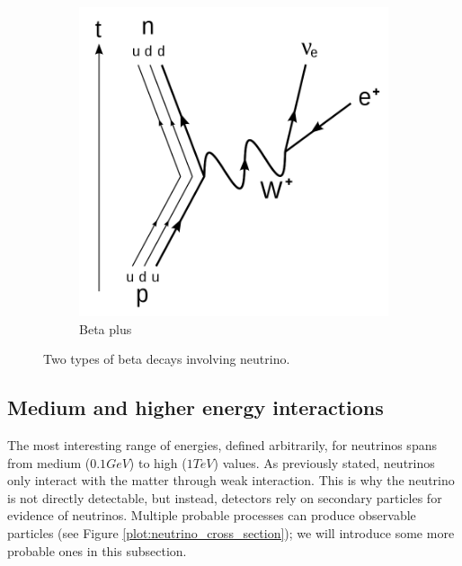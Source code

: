 \begin{figure}[H]
\begin{subfigure}[b]{0.35\textwidth}
    \includegraphics[width=\linewidth]{figures/chapter6/768px-Electron_Capture_Decay.svg.png}
\caption{Beta plus}
   \label{plot:beta_p}
  \end{subfigure}
  \caption[Beta decay]{Two types of beta decays involving neutrino\footnotemark. }

    \label{plot:beta_decays}
\end{figure}


\subsection{Medium and higher energy interactions}


The most interesting range of energies, defined arbitrarily, for neutrinos spans from medium ($0.1 GeV$) to high ($1TeV$) values.
As previously stated, neutrinos only interact with the matter through weak interaction.
This is why the neutrino is not directly detectable, but instead, detectors rely on secondary particles for evidence of neutrinos.
Multiple probable processes can produce observable particles (see Figure \ref{plot:neutrino_cross_section}); we will introduce some more probable ones in this subsection.

